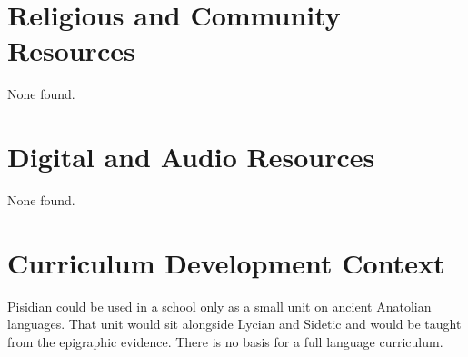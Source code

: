 \documentclass[12pt]{article}
\begin{document}
\section{Religious and Community Resources}
None found.

\section{Digital and Audio Resources}
None found.

\section{Curriculum Development Context}
Pisidian could be used in a school only as a small unit on ancient Anatolian languages. That unit would sit alongside Lycian and Sidetic and would be taught from the epigraphic evidence. There is no basis for a full language curriculum.
\end{document}
